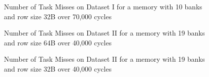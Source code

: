 \begin{figure}
\centering
{}
\caption{Number of Task Misses on Dataset I for a memory with 10 banks and row size 32B over 70,000 cycles}
\end{figure}

\begin{figure}
\centering
{}
\caption{Number of Task Misses on Dataset II for a memory with 19 banks and row size 64B over 40,000 cycles}
\end{figure}

\begin{figure}
\centering
{}
\caption{Number of Task Misses on Dataset II for a memory with 19 banks and row size 32B over 40,000 cycles}
\end{figure}


